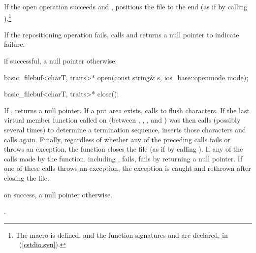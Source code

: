 \begin{itemdescr}
\pnum
If the open operation succeeds and
,
positions the file to the end
(as if by calling
).\footnote{The macro
is defined, and the function signatures
%
and
%
are declared, in
%
~(\ref{cstdio.syn}).}

\pnum
If the repositioning operation fails, calls
and returns a null pointer to indicate failure.

\pnum
\returns
{}
if successful, a null pointer otherwise.
\end{itemdescr}

%
\begin{itemdecl}
basic_filebuf<charT, traits>* open(const string& s,
                                   ios_base::openmode mode);
\end{itemdecl}

\begin{itemdescr}
\returns
{}
\end{itemdescr}

%
\begin{itemdecl}
basic_filebuf<charT, traits>* close();
\end{itemdecl}

\begin{itemdescr}
\pnum
\effects
If
,
returns a null pointer.
If a put area exists, calls
to flush characters.
If the last virtual member function called on
(between
,
,
,
and
)
was
then calls
(possibly several times) to determine a termination sequence, inserts those
characters and calls
again.
Finally, regardless of whether any of the preceding calls fails or throws an
exception, the function closes the file
(as if by calling
%
).
If any of the calls made by the function, including , fails,
 fails by returning a null pointer. If one of these calls throws an
exception, the exception is caught and rethrown after closing the file.

\pnum
\returns
{}
on success, a null pointer otherwise.

\pnum
\postconditions
{}.
\end{itemdescr}

